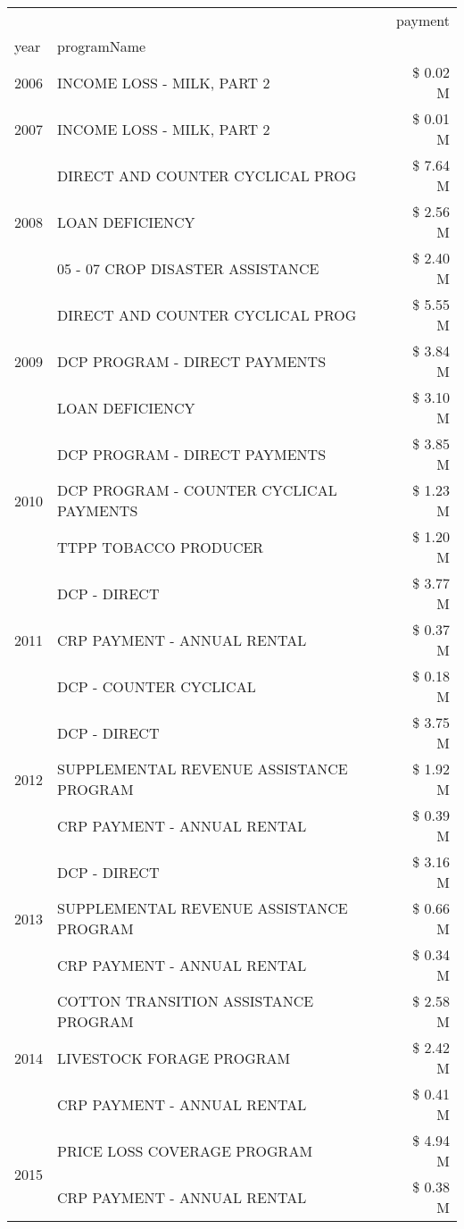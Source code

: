 \begin{tabular}{llr}
\toprule
 &  & payment \\
year & programName &  \\
\midrule
2006 & INCOME LOSS - MILK, PART 2 & \$ 0.02 M \\
\cline{1-3}
2007 & INCOME LOSS - MILK, PART 2 & \$ 0.01 M \\
\cline{1-3}
\multirow[t]{3}{*}{2008} & DIRECT AND COUNTER CYCLICAL PROG & \$ 7.64 M \\
 & LOAN DEFICIENCY & \$ 2.56 M \\
 & 05 - 07 CROP DISASTER ASSISTANCE & \$ 2.40 M \\
\cline{1-3}
\multirow[t]{3}{*}{2009} & DIRECT AND COUNTER CYCLICAL PROG & \$ 5.55 M \\
 & DCP PROGRAM - DIRECT PAYMENTS & \$ 3.84 M \\
 & LOAN DEFICIENCY & \$ 3.10 M \\
\cline{1-3}
\multirow[t]{3}{*}{2010} & DCP PROGRAM - DIRECT PAYMENTS & \$ 3.85 M \\
 & DCP PROGRAM - COUNTER CYCLICAL PAYMENTS & \$ 1.23 M \\
 & TTPP TOBACCO PRODUCER & \$ 1.20 M \\
\cline{1-3}
\multirow[t]{3}{*}{2011} & DCP - DIRECT & \$ 3.77 M \\
 & CRP PAYMENT - ANNUAL RENTAL & \$ 0.37 M \\
 & DCP - COUNTER CYCLICAL & \$ 0.18 M \\
\cline{1-3}
\multirow[t]{3}{*}{2012} & DCP - DIRECT & \$ 3.75 M \\
 & SUPPLEMENTAL REVENUE ASSISTANCE PROGRAM & \$ 1.92 M \\
 & CRP PAYMENT - ANNUAL RENTAL & \$ 0.39 M \\
\cline{1-3}
\multirow[t]{3}{*}{2013} & DCP - DIRECT & \$ 3.16 M \\
 & SUPPLEMENTAL REVENUE ASSISTANCE PROGRAM & \$ 0.66 M \\
 & CRP PAYMENT - ANNUAL RENTAL & \$ 0.34 M \\
\cline{1-3}
\multirow[t]{3}{*}{2014} & COTTON TRANSITION ASSISTANCE PROGRAM & \$ 2.58 M \\
 & LIVESTOCK FORAGE PROGRAM & \$ 2.42 M \\
 & CRP PAYMENT - ANNUAL RENTAL & \$ 0.41 M \\
\cline{1-3}
\multirow[t]{3}{*}{2015} & PRICE LOSS COVERAGE PROGRAM & \$ 4.94 M \\
 & CRP PAYMENT - ANNUAL RENTAL & \$ 0.38 M \\

\end{tabular}

